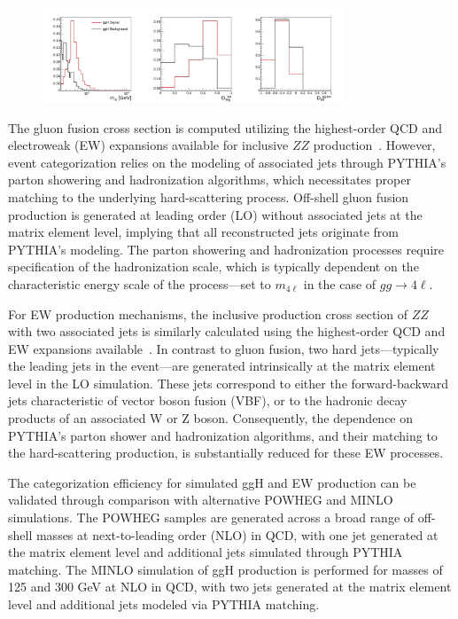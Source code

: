\begin{figure}[!ht]
\centering
\includegraphics[width=0.8\textwidth,clip] {figures/DiscDists.jpg}
\caption{}
\label{fig:DiscDists}
\end{figure}

The gluon fusion cross section is computed utilizing the highest-order QCD and electroweak (EW) expansions available for inclusive $ZZ$ production~\cite{deFlorian:2016spz}. 
However, event categorization relies on the modeling of associated jets through PYTHIA's parton showering and hadronization algorithms, which necessitates proper matching to the underlying hard-scattering process. Off-shell gluon fusion production is generated at leading order (LO) without associated jets at the matrix element level, implying that all reconstructed jets originate from PYTHIA's modeling. 
The parton showering and hadronization processes require specification of the hadronization scale, which is typically dependent on the characteristic energy scale of the process—set to $m_{4\ell}$ in the case of $gg\to 4\ell$.

For EW production mechanisms, the inclusive production cross section of $ZZ$ with two associated jets is similarly calculated using the highest-order QCD and EW expansions available~\cite{deFlorian:2016spz}. 
In contrast to gluon fusion, two hard jets—typically the leading jets in the event—are generated intrinsically at the matrix element level in the LO simulation. 
These jets correspond to either the forward-backward jets characteristic of vector boson fusion (VBF), or to the hadronic decay products of an associated W or Z boson. 
Consequently, the dependence on PYTHIA's parton shower and hadronization algorithms, and their matching to the hard-scattering production, is substantially reduced for these EW processes.

The categorization efficiency for simulated ggH and EW \Hboson production can be validated through comparison with alternative POWHEG and MINLO simulations. 
The POWHEG samples are generated across a broad range of off-shell \Hboson masses at next-to-leading order (NLO) in QCD, with one jet generated at the matrix element level and additional jets simulated through PYTHIA matching. 
The MINLO simulation of ggH production is performed for \Hboson masses of 125 and $300$ GeV at NLO in QCD, with two jets generated at the matrix element level and additional jets modeled via PYTHIA matching.

